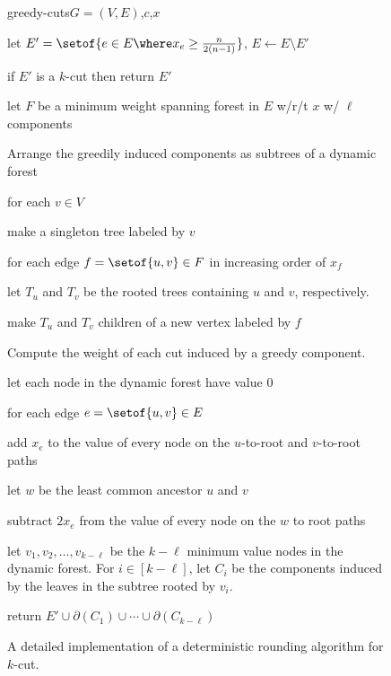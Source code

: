 \documentclass{toc}
\newcommand{\cost}{c} %
\begin{document}
\begin{figure}[t!]
  \begin{algorithm}{greedy-cuts}{$G=(V,E)$,$\cost$,$x$}
  \item let $E' = \setof{e \in E \where x_e \geq \frac{n}{2 (n-1)}}$,
    $E \gets E \setminus E'$
  \item if $E'$ is a $k$-cut then return $E'$
  \item let $F$ be a minimum weight spanning forest in $E$ w/r/t $x$
    w/ $\ell$ components
    \begin{itemcomment}
      Arrange the greedily induced components as subtrees of a
      dynamic forest
    \end{itemcomment}
  \item for each $v \in V$
    \begin{steps}
    \item make a singleton tree labeled by $v$
    \end{steps}
  \item for each edge $f = \setof{u,v} \in F$ in increasing order of
    $x_f$
    \begin{steps}
    \item let $T_u$ and $T_v$ be the rooted trees containing $u$ and
      $v$, respectively.
    \item make $T_u$ and $T_v$ children of a new vertex labeled by
      $f$
    \end{steps}
    \begin{itemcomment}
      Compute the weight of each cut induced by a greedy component.
    \end{itemcomment}
  \item let each node in the dynamic forest have value $0$
  \item for each edge $e = \setof{u,v} \in E$
    \begin{steps}
    \item add $x_e$ to the value of every node on the $u$-to-root
      and $v$-to-root paths
    \item let $w$ be the least common ancestor $u$ and $v$
    \item subtract $2 x_e$ from the value of every node on the $w$
      to root paths
    \end{steps}
  \item let $v_1,v_2,\dots,v_{k - \ell}$ be the $k - \ell$ minimum
    value nodes in the dynamic forest. For $i \in [k-\ell]$, let
    $C_i$ be the components induced by the leaves in the subtree
    rooted by $v_i$.
  \item return
    $E' \cup \partial(C_1) \cup \cdots \cup \partial(C_{k-\ell})$
  \end{algorithm}
  \begin{implicitframed}
    \caption{A detailed implementation of a deterministic rounding
      algorithm for $k$-cut. }
  \end{implicitframed}
\end{figure}
\end{document}
